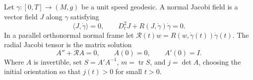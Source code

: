 Let \(\gamma:[0,T]\to(M,g)\) be a unit speed geodesic. A normal Jacobi field is a vector field \(J\) along \(\gamma\) satisfying
\[
\langle J,\dot\gamma\rangle=0,\qquad
D_t^2J+R(J,\dot\gamma)\dot\gamma=0.
\]
In a parallel orthonormal normal frame let \(\mathcal R(t)w=R(w,\dot\gamma(t))\dot\gamma(t)\). The radial Jacobi tensor is the matrix solution
\[
A''+\mathcal R A=0,\qquad A(0)=0,\qquad A'(0)=I.
\]
Where \(A\) is invertible, set \(S=A'A^{-1}\), \(m=\operatorname{tr}S\), and \(j=\det A\), choosing the initial orientation so that \(j(t)>0\) for small \(t>0\).